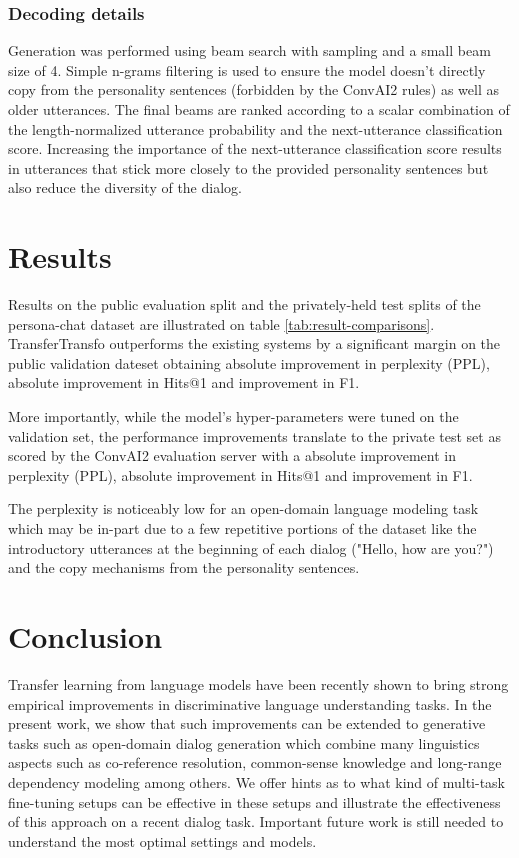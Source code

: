 \documentclass[letterpaper]{article} \usepackage{aaai19}  \usepackage{times}  \usepackage{helvet}  \usepackage{courier}  \usepackage{url}  \usepackage{graphicx}  \usepackage{natbib}
\begin{document}
\subsubsection{Decoding details}

Generation was performed using beam search with sampling and a small beam size of 4. Simple n-grams filtering is used to ensure the model doesn't directly copy from the personality sentences (forbidden by the ConvAI2 rules) as well as older utterances. The final beams are ranked according to a scalar combination of the length-normalized utterance probability and the next-utterance classification score. Increasing the importance of the next-utterance classification score results in utterances that stick more closely to the provided personality sentences but also reduce the diversity of the dialog.

\section{Results}

Results on the public evaluation split and the privately-held test splits of the {\sc persona-chat} dataset are illustrated on table \ref{tab:result-comparisons}. TransferTransfo outperforms the existing systems by a significant margin on the public validation dateset obtaining  absolute improvement in perplexity (PPL),  absolute improvement in Hits@1 and  improvement in F1.

More importantly, while the model's hyper-parameters were tuned on the validation set, the performance improvements translate to the private test set as scored by the ConvAI2 evaluation server with a  absolute improvement in perplexity (PPL),  absolute improvement in Hits@1 and  improvement in F1.

The perplexity is noticeably low for an open-domain language modeling task which may be in-part due to a few repetitive portions of the dataset like the introductory utterances at the beginning of each dialog ("Hello, how are you?") and the copy mechanisms from the personality sentences.

\section{Conclusion}

Transfer learning from language models have been recently shown to bring strong empirical improvements in discriminative language understanding tasks. In the present work, we show that such improvements can be extended to generative tasks such as open-domain dialog generation which combine many linguistics aspects such as co-reference resolution, common-sense knowledge and long-range dependency modeling among others. We offer hints as to what kind of multi-task fine-tuning setups can be effective in these setups and illustrate the effectiveness of this approach on a recent dialog task. Important future work is still needed to understand the most optimal settings and models.



\end{document}
